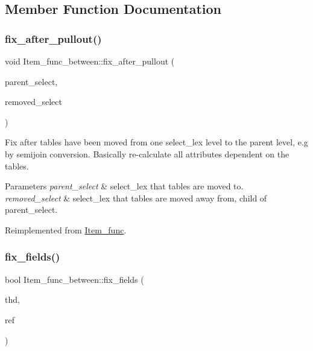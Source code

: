 \subsection{Member Function Documentation}
\mbox{\label{classItem__func__between_ade856fd17d40b1e39a2cdde5591423f3}} 
\subsubsection{\texorpdfstring{fix\+\_\+after\+\_\+pullout()}{fix\_after\_pullout()}}
{\footnotesize\ttfamily void Item\+\_\+func\+\_\+between\+::fix\+\_\+after\+\_\+pullout (\begin{DoxyParamCaption}\item[{st\+\_\+select\+\_\+lex $\ast$}]{parent\+\_\+select,  }\item[{st\+\_\+select\+\_\+lex $\ast$}]{removed\+\_\+select }\end{DoxyParamCaption})\hspace{0.3cm}{\ttfamily [virtual]}}

Fix after tables have been moved from one select\+\_\+lex level to the parent level, e.\+g by semijoin conversion. Basically re-\/calculate all attributes dependent on the tables.


\begin{DoxyParams}{Parameters}
{\em parent\+\_\+select} & select\+\_\+lex that tables are moved to. \\
\hline
{\em removed\+\_\+select} & select\+\_\+lex that tables are moved away from, child of parent\+\_\+select. \\
\hline
\end{DoxyParams}


Reimplemented from \mbox{\hyperlink{classItem__func_ab2b8cc7a3bf580679718da7e99e3e8d9}{Item\+\_\+func}}.

\mbox{\label{classItem__func__between_aca3574854cf2d270a2eb3b3536d062cf}} 
\subsubsection{\texorpdfstring{fix\+\_\+fields()}{fix\_fields()}}
{\footnotesize\ttfamily bool Item\+\_\+func\+\_\+between\+::fix\+\_\+fields (\begin{DoxyParamCaption}\item[{T\+HD $\ast$}]{thd,  }\item[{\mbox{\hyperlink{classItem}{Item}} $\ast$$\ast$}]{ref }\end{DoxyParamCaption})\hspace{0.3cm}{\ttfamily [virtual]}}

